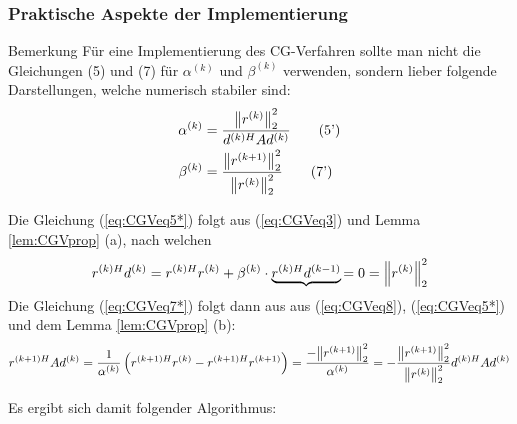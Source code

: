\subsubsection{Praktische Aspekte der Implementierung}
\begin{colbox}{Bemerkung}
  Für eine Implementierung des CG-Verfahren sollte man nicht die Gleichungen (5) und (7) für $\alpha^{(k)}$ 
  und $\beta^{(k)}$ verwenden, sondern lieber folgende Darstellungen, welche numerisch stabiler sind:
  \begin{align*}
    \alpha^{(k)} &= \dfrac{\vertn{2}{r^{(k)}}_2^2}{{d^{(k)H}}Ad^{(k)}} \tag{5'}\label{eq:CGVeq5*} \\
    \beta^{(k)} &= \dfrac{\vertn{2}{r^{(k+1)}}_2^2}{\vertn{2}{r^{(k)}}_2^2} \tag{7'}\label{eq:CGVeq7*}
  \end{align*}
\end{colbox}
Die Gleichung (\ref{eq:CGVeq5*}) folgt aus (\ref{eq:CGVeq3}) und Lemma \ref{lem:CGVprop} (a), nach welchen
%
\begin{align*}
  {r^{(k)H}}d^{(k)} 
  = {r^{(k)H}}r^{(k)} + \beta^{(k)}\cdot \underbrace{{r^{(k)H}}d^{(k-1)}}{=0}
  = \vertn{2}{r^{(k)}}_2^2
\end{align*}
%
Die Gleichung (\ref{eq:CGVeq7*}) folgt dann aus aus (\ref{eq:CGVeq8}), (\ref{eq:CGVeq5*}) 
und dem Lemma \ref{lem:CGVprop} (b):
%
\begin{align*}
  {r^{(k+1)H}}Ad^{(k)} 
  = \dfrac{1}{\alpha^{(k)}}\left({r^{(k+1)H}}r^{(k)} - {r^{(k+1)H}}r^{(k+1)}\right) 
  =\dfrac{-\vertn{2}{r^{(k+1)}}_2^2}{\alpha^{(k)}} 
  = -\dfrac{\vertn{2}{r^{(k+1)}}_2^2}{\vertn{2}{r^{(k)}}_2^2}{d^{(k)H}}Ad^{(k)}
\end{align*} 

Es ergibt sich damit folgender Algorithmus:



